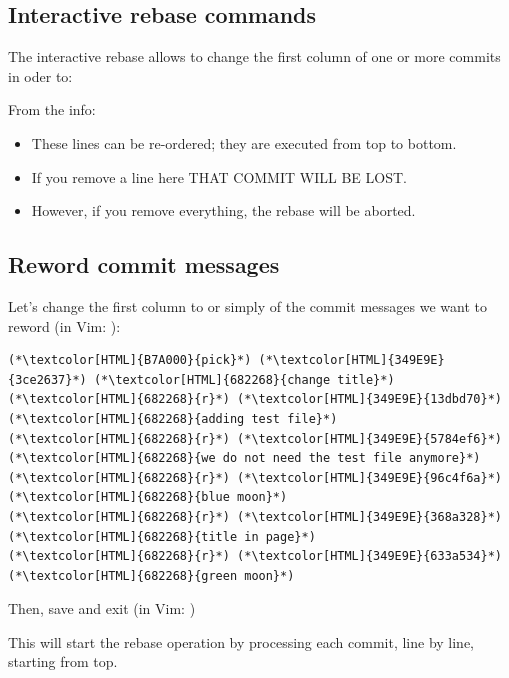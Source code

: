 \subsection{Interactive rebase commands}
\begin{frame}[fragile]
  \subslidetitle

  The interactive rebase allows to change the first column of one or more commits in oder to:

  \begin{itemize}
    \pause
    \pause
    \pause
    \pause
    \pause
  \end{itemize}

  \pause
  \vspace{1em}
  From the  info:
  \begin{itemize}
    \item These lines can be re-ordered; they are executed from top to bottom.
    \item If you remove a line here THAT COMMIT WILL BE LOST.
    \item However, if you remove everything, the rebase will be aborted.
  \end{itemize}

\end{frame}

\subsection{Reword commit messages}
\begin{frame}[fragile]
  \subslidetitle

  Let's change the first column to  or simply  of the commit messages we want to reword (in Vim: ):
  \begin{lstlisting}
(*\textcolor[HTML]{B7A000}{pick}*) (*\textcolor[HTML]{349E9E}{3ce2637}*) (*\textcolor[HTML]{682268}{change title}*)
(*\textcolor[HTML]{682268}{r}*) (*\textcolor[HTML]{349E9E}{13dbd70}*) (*\textcolor[HTML]{682268}{adding test file}*)
(*\textcolor[HTML]{682268}{r}*) (*\textcolor[HTML]{349E9E}{5784ef6}*) (*\textcolor[HTML]{682268}{we do not need the test file anymore}*)
(*\textcolor[HTML]{682268}{r}*) (*\textcolor[HTML]{349E9E}{96c4f6a}*) (*\textcolor[HTML]{682268}{blue moon}*)
(*\textcolor[HTML]{682268}{r}*) (*\textcolor[HTML]{349E9E}{368a328}*) (*\textcolor[HTML]{682268}{title in page}*)
(*\textcolor[HTML]{682268}{r}*) (*\textcolor[HTML]{349E9E}{633a534}*) (*\textcolor[HTML]{682268}{green moon}*)
\end{lstlisting}
  Then, save and exit (in Vim: )

  \vspace{1em}
  This will start the rebase operation by processing each commit, line by line, starting from top.

\end{frame}

